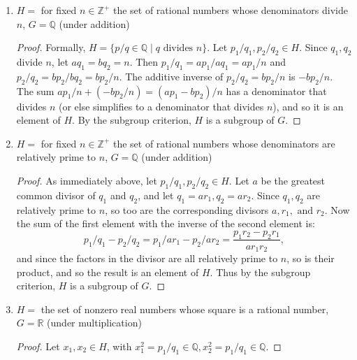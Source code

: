 \documentclass{article}
\begin{document}
\begin{enumerate}[label=(\alph*)]
\begin{proof}
            Further, the product $(a + bi)(c + di) = ac - bd + (ad + bc)i$ has absolute value $\sqrt{(ac - bd)^2 + (ad + bc)^2}$. This simplifies to:
            \begin{multline*}
                \sqrt{a^2c^2 - 2abcd + b^2d^2 + a^2d^2 + 2abcd + b^2c^2} = \\
                \sqrt{a^2c^2 + a^2d^2 + b^2c^2 + b^2d^2} = \sqrt{a^2(c^2 + d^2) + b^2(c^2 + d^2)} = \\
                \sqrt{(a^2 + b^2)(c^2 + d^2)} = \sqrt{a^2 + b^2}\sqrt{c^2 + d^2} = 1,
            \end{multline*}
            and so $H$ is closed under multiplication. Thus it is a subgroup of $G$.
          \end{proof}
    \item $H = $ for fixed $n \in \mathbb{Z}^+$ the set of rational numbers whose denominators divide $n$, $G = \mathbb{Q}$ (under addition)
          \begin{proof}
            Formally, $H = \{ p/q \in \mathbb{Q} \mid q \text{ divides } n \}$. Let $p_1/q_1, p_2/q_2 \in H$. Since $q_1, q_2$ divide $n$, let $aq_1 = bq_2 = n$. Then $p_1/q_1 = ap_1/aq_1 = ap_1/n$ and $p_2/q_2 = bp_2/bq_2 = bp_2/n$. The additive inverse of $p_2/q_2 = bp_2/n$ is $-bp_2/n$. The sum $ap_1/n + (-bp_2/n) = (ap_1 - bp_2)/n$ has a denominator that divides $n$ (or else simplifies to a denominator that divides $n$), and so it is an element of $H$. By the subgroup criterion, $H$ is a subgroup of $G$.
          \end{proof}
    \item $H = $ for fixed $n \in \mathbb{Z}^+$ the set of rational numbers whose denominators are relatively prime to $n$, $G = \mathbb{Q}$ (under addition)
          \begin{proof}
            As immediately above, let $p_1/q_1, p_2/q_2 \in H$. Let $a$ be the greatest common divisor of $q_1$ and $q_2$, and let $q_1 = ar_1, q_2 = ar_2$. Since $q_1, q_2$ are relatively prime to $n$, so too are the corresponding divisors $a, r_1, \text{ and } r_2$. Now the sum of the first element with the inverse of the second element is:
            \begin{equation*}
                p_1/q_1 - p_2/q_2 = p_1/ar_1 - p_2/ar_2 = \frac{p_1r_2 - p_2r_1}{ar_1r_2},
            \end{equation*}
            and since the factors in the divisor are all relatively prime to $n$, so is their product, and so the result is an element of $H$. Thus by the subgroup criterion, $H$ is a subgroup of $G$.
          \end{proof}
    \item $H = $ the set of nonzero real numbers whose square is a rational number, $G = \mathbb{R}$ (under multiplication)
          \begin{proof}
            Let $x_1, x_2 \in H$, with $x_1^2 = p_1/q_1 \in \mathbb{Q}, x_2^2 = p_1/q_1 \in \mathbb{Q}$.
            

\end{proof}
\end{enumerate}
\end{document}
